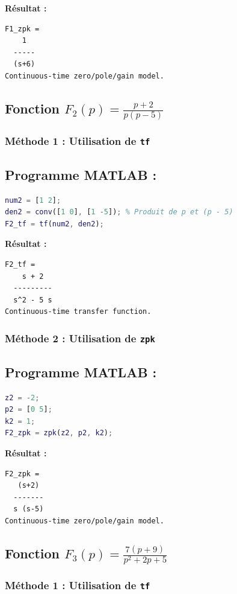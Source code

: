 \documentclass{article}
\begin{document}
\textbf{Résultat :}
\begin{verbatim}
F1_zpk =
    1
  -----
  (s+6)
Continuous-time zero/pole/gain model.
\end{verbatim}

\subsection*{Fonction $F_2(p) = \frac{p + 2}{p(p - 5)}$}

\subsubsection*{Méthode 1 : Utilisation de \texttt{tf}}
\subsection*{Programme MATLAB :}
\begin{lstlisting}[language=Matlab]
% F2(p) = (p + 2) / (p * (p - 5))
num2 = [1 2]; 
den2 = conv([1 0], [1 -5]); % Produit de p et (p - 5)
F2_tf = tf(num2, den2);
\end{lstlisting}

\textbf{Résultat :}
\begin{verbatim}
F2_tf =
    s + 2
  ---------
  s^2 - 5 s
Continuous-time transfer function.
\end{verbatim}

\subsubsection*{Méthode 2 : Utilisation de \texttt{zpk}}
\subsection*{Programme MATLAB :}
\begin{lstlisting}[language=Matlab]
% F2(p)
z2 = -2; 
p2 = [0 5]; 
k2 = 1; 
F2_zpk = zpk(z2, p2, k2);
\end{lstlisting}

\textbf{Résultat :}
\begin{verbatim}
F2_zpk =
   (s+2)
  -------
  s (s-5)
Continuous-time zero/pole/gain model.
\end{verbatim}
\newpage
\subsection*{Fonction $F_3(p) = \frac{7(p + 9)}{p^2 + 2p + 5}$}

\subsubsection*{Méthode 1 : Utilisation de \texttt{tf}}
\end{document}
